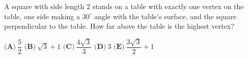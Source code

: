 A square with side length $2$ stands on a table with exactly one vertex on the table, one side making a $30^\circ$ angle with the table's surface, and the square perpendicular to the table. How far above the table is the highest vertex?

$\textbf{(A)}\ $$\dfrac52$ \qquad $\textbf{(B)}\ $$\sqrt3+1$ \qquad $\textbf{(C)}\ $$\dfrac{4\sqrt3}{3}$ \qquad $\textbf{(D)}\ $$3$ \qquad $\textbf{(E)}\ $$\dfrac{3\sqrt3}2+1$
